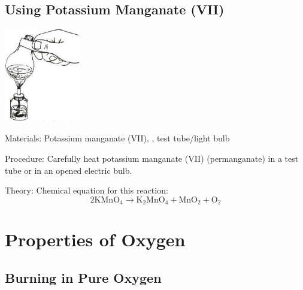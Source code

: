 \begin{multicols}{2}
\vfill
\columnbreak

\subsection{Using Potassium Manganate (VII)} %

\begin{center}
\includegraphics[width=0.25\textwidth]{./img/source/oxygen-prep.jpg}
\end{center}

\begin{description*}
\item[Materials:]{Potassium manganate (VII), , test tube/light bulb}
\item[Procedure:]{Carefully heat potassium manganate (VII) (permanganate) in a test
tube or in an opened electric bulb.}
\item[Theory:]{Chemical equation for this reaction: \[ 2\mathrm{K}\mathrm{Mn}\mathrm{O}_4 \longrightarrow \mathrm{K}_2\mathrm{Mn}\mathrm{O}_4 + \mathrm{Mn}\mathrm{O}_2 + \mathrm{O}_2 \]}
\end{description*}


\section*{Properties of Oxygen}


\subsection{Burning in Pure Oxygen}


\end{multicols}
